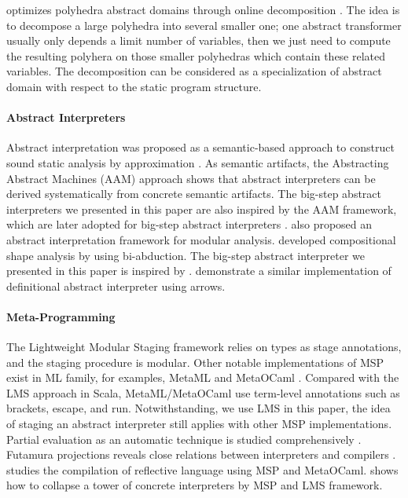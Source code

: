 \citeauthor{DBLP:conf/popl/SinghPV17} optimizes polyhedra abstract domains
through online decomposition \cite{DBLP:conf/popl/SinghPV17,
Singh:2017:PCD:3177123.3158143}. The idea is to decompose a large polyhedra into
several smaller one; one abstract transformer usually only depends a limit
number of variables, then we just need to compute the resulting polyhera on
those smaller polyhedras which contain these related variables. The decomposition
can be considered as a specialization of abstract domain with respect to the
static program structure.

\paragraph{Abstract Interpreters} Abstract interpretation was proposed as a
semantic-based approach to construct sound static analysis by approximation
\cite{DBLP:conf/popl/CousotC77}. As semantic artifacts, the Abstracting Abstract
Machines (AAM) \cite{DBLP:journals/jfp/HornM12, DBLP:conf/icfp/HornM10} approach
shows that abstract interpreters can be derived systematically from concrete
semantic artifacts. The big-step abstract interpreters we presented in this
paper are also inspired by the AAM framework, which are later adopted for
big-step abstract interpreters \cite{DBLP:journals/pacmpl/DaraisLNH17,
Wei:2018:RAA:3243631.3236800}. \cite{DBLP:conf/cc/CousotC02} also proposed an
abstract interpretation framework for modular analysis.
\citet{DBLP:conf/popl/CalcagnoDOY09} developed compositional shape analysis by
using bi-abduction. The big-step abstract interpreter we presented in this paper
is inspired by \cite{DBLP:journals/pacmpl/DaraisLNH17,
Wei:2018:RAA:3243631.3236800}. \citet{Keidel:2018:CSP:3243631.3236767}
demonstrate a similar implementation of definitional abstract interpreter using
arrows.

\paragraph{Meta-Programming} The Lightweight Modular Staging framework relies on
types as stage annotations, and the staging procedure is modular. Other notable
implementations of MSP exist in ML family, for examples, MetaML
\cite{DBLP:conf/pepm/TahaS97} and MetaOCaml \cite{DBLP:conf/gpce/CalcagnoTHL03,
DBLP:conf/flops/Kiselyov14}. Compared with the LMS approach in Scala,
MetaML/MetaOCaml use term-level annotations such as brackets, escape, and run.
Notwithstanding, we use LMS in this paper, the idea of staging an abstract
interpreter still applies with other MSP implementations. Partial evaluation as
an automatic technique is studied comprehensively
\cite{10.1007/3-540-61580-6_11, DBLP:books/daglib/0072559}. Futamura projections
reveals close relations between interpreters and compilers \cite{Futamura1999,
futamura1971partial}. \citet{DBLP:conf/gpce/Asai14} studies the compilation of
reflective language using MSP and MetaOCaml.
\citeauthor{Amin:2017:CTI:3177123.3158140} shows how to collapse a tower of
concrete interpreters by MSP and LMS framework.

\cite{10.1007/11561347_18}
